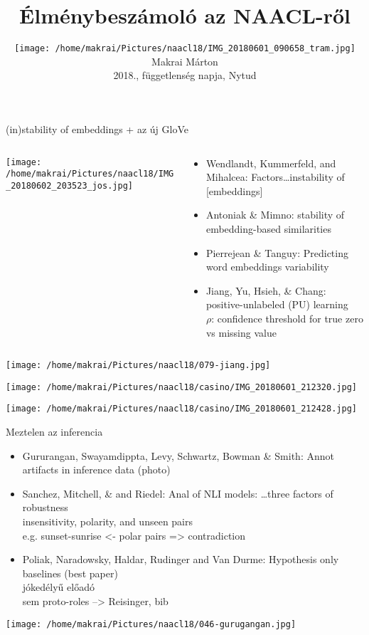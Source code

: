 \documentclass{beamer}
\author[Makrai Márton]{
  \texttt{[image: /home/makrai/Pictures/naacl18/IMG\_20180601\_090658\_tram.jpg]} \\
  Makrai Márton \\ 
  2018., függetlenség napja, Nytud}
\date[2018., függetlenség napja]{}
\title{Élménybeszámoló az NAACL-ről}
\begin{document}
\maketitle

\begin{frame}[allowframebreaks]{(in)stability of embeddings + az új GloVe}
  \begin{columns}\begin{column}{.35\textwidth}\centering
  \texttt{[image: /home/makrai/Pictures/naacl18/IMG\_20180602\_203523\_jos.jpg]}\end{column}\begin{column}{.65\textwidth}
    \begin{itemize}
      \item Wendlandt, Kummerfeld, and Mihalcea: 
        Factors\dots  instability of [embeddings]
      \item Antoniak \& Mimno: stability of embedding-based similarities
      \item Pierrejean \& Tanguy: Predicting word embeddings variability 
      \item Jiang, Yu, Hsieh, \& Chang: positive-unlabeled (PU) learning
        \\ $\rho$: confidence threshold for true zero vs missing value 
    \end{itemize}
  \end{column}\end{columns}
  \centering
  \texttt{[image: /home/makrai/Pictures/naacl18/079-jiang.jpg]}
\end{frame}

  \begin{frame}[allowframebreaks]
    \texttt{[image: /home/makrai/Pictures/naacl18/casino/IMG\_20180601\_212320.jpg]}

    \texttt{[image: /home/makrai/Pictures/naacl18/casino/IMG\_20180601\_212428.jpg]}
  \end{frame}

\begin{frame}[allowframebreaks]{Meztelen az inferencia}
  \begin{itemize} 
    \item Gururangan, Swayamdippta, Levy, Schwartz, Bowman \& Smith: 
      Annot artifacts in inference data (photo)
    \item Sanchez, Mitchell, \& and Riedel: 
      Anal of NLI models: \dots   three factors of robustness
      \\ insensitivity, polarity, and unseen pairs
      \\ e.g. sunset-sunrise <- polar pairs => contradiction
    \item Poliak, Naradowsky, Haldar, Rudinger and Van Durme: 
      Hypothesis only baselines (best paper)
      \\ jókedélyű előadó
      \\ sem proto-roles --> Reisinger, bib 
  \end{itemize}
      \texttt{[image: /home/makrai/Pictures/naacl18/046-gurugangan.jpg]}
\end{frame}
\end{document}
